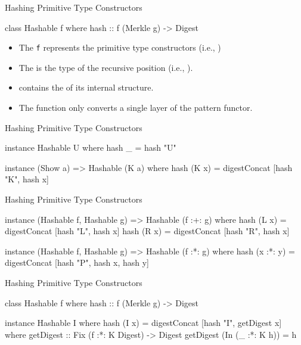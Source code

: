 \begin{slide}{Hashing Primitive Type Constructors}
\begin{haskell}

class Hashable f where
  hash :: f (Merkle g) -> Digest
\end{haskell}

\begin{itemize}
  \item The \texttt{f} represents the primitive type constructors (i.e., ) 
  \item The  is the type of the recursive position (i.e., ). 
  \item {} contains the  of its internal structure.
  \item The  function only converts a single layer of the pattern functor.
\end{itemize}
\end{slide}

\begin{slide}{Hashing Primitive Type Constructors}
\begin{haskell}
instance Hashable U where
  hash _ = hash "U"

instance (Show a) => Hashable (K a) where
  hash (K x) = digestConcat [hash "K", hash x]
\end{haskell}
\end{slide}

\begin{slide}{Hashing Primitive Type Constructors}
\begin{haskell}
instance (Hashable f, Hashable g) => Hashable (f :+: g) where
  hash (L x) = digestConcat [hash "L", hash x]
  hash (R x) = digestConcat [hash "R", hash x]

instance (Hashable f, Hashable g) => Hashable (f :*: g) where
  hash (x :*: y) = digestConcat [hash "P", hash x, hash y]
\end{haskell}
\end{slide}

\begin{slide}{Hashing Primitive Type Constructors}
\begin{haskell}
class Hashable f where
  hash :: f (Merkle g) -> Digest


instance Hashable I where
  hash (I x) = digestConcat [hash "I", getDigest x]
    where
      getDigest :: Fix (f :*: K Digest) -> Digest
      getDigest (In (_ :*: K h)) = h
\end{haskell}
\end{slide}

